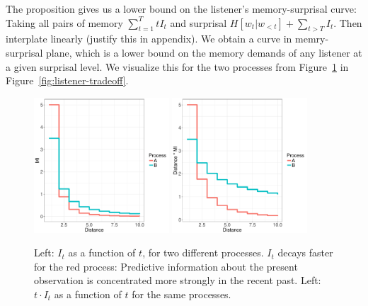 The proposition gives us a lower bound on the listener's memory-surprisal curve: Taking all pairs of memory $\sum_{t=1}^T t I_t$ and surprisal $H[w_t|w_{<t}] + \sum_{t > T} I_t$.
Then interplate linearly (justify this in appendix).
We obtain a curve in memry-surprisal plane, which is a lower bound on the memory demands of any listener at a given surprisal level.
We visualize this for the two processes from Figure~\ref{fig:basic} in Figure~\ref{fig:listener-tradeoff}.


\begin{figure}
\includegraphics[width=0.45\textwidth]{../code/toy/figures/decay.pdf}
\includegraphics[width=0.45\textwidth]{../code/toy/figures/memory.pdf}
%
	\caption{Left: $I_t$ as a function of $t$, for two different processes. $I_t$ decays faster for the red process: Predictive information about the present observation is concentrated more strongly in the recent past. Left: $t \cdot I_t$ as a function of $t$ for the same processes. }\label{fig:basic}
\end{figure}



